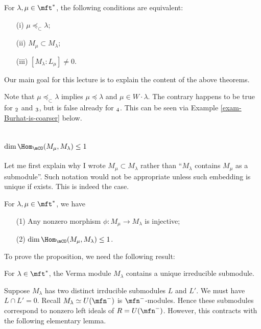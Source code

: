\begin{cor}
	For $\lambda,\mu \in \mft^*$, the following conditions are equivalent:
	\begin{itemize}
		\item[(i)]
			$\mu \preceq_\subset \lambda$;
		\item[(ii)]
			$M_\mu \subset M_\lambda$;
		\item[(iii)]
			$[M_\lambda:L_\mu] \neq 0$.
	\end{itemize}
\end{cor}

	Our main goal for this lecture is to explain the content of the above theorems.

\begin{warn}
	Note that $\mu \preceq_\subset \lambda$ implies $\mu \preceq \lambda$ and $\mu \in W\cdot \lambda$. The contrary happens to be true for $\sl_2$ and $\sl_3$, but is false already for $\sl_4$. This can be seen via Example \ref{exam-Burhat-is-coarser} below.
\end{warn}

\section{\texorpdfstring{$\dim \Hom_\mCO( M_\mu,M_\lambda ) \le 1$}{At most one morphism between Verma modules}}
	Let me first explain why I wrote $M_\mu \subset M_\lambda$ rather than ``$M_\lambda$ contains $M_\mu$ as a submodule''. Such notation would not be appropriate unless such embedding is unique if exists. This is indeed the case.

\begin{prop}
	\label{prop-Hom-Verma}
	For $\lambda,\mu \in \mft^*$, we have
	\begin{itemize}
		\item[(1)]
			Any nonzero morphism $\phi: M_\mu \to M_\lambda$ is injective;
		\item[(2)]
			$\dim \Hom_\mCO( M_\mu,M_\lambda ) \le 1$.
	\end{itemize}
\end{prop}

To prove the proposition, we need the following result:

\begin{prop}
	\label{prop-simplesub-Verma}
	For $\lambda \in \mft^*$, the Verma module $M_\lambda$ contains a unique irreducible submodule.
\end{prop}

\proof
	Suppose $M_\lambda$ has two distinct irrducible submodules $L$ and $L'$. We must have $L\cap L' = 0$. Recall $M_\lambda \simeq U(\mfn^-)$ is $\mfn^-$-modules. Hence these submodules correspond to nonzero left ideals of $R=U(\mfn^-)$. However, this contracts with the following elementary lemma.

